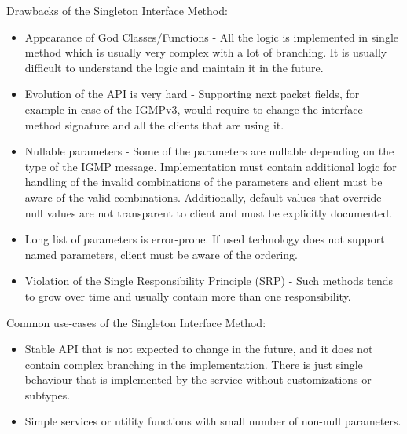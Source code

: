 Drawbacks of the Singleton Interface Method:

\begin{itemize}
    \item Appearance of God Classes/Functions - All the logic is implemented in single method which is usually
    very complex with a lot of branching.
    It is usually difficult to understand the logic and maintain it in the future.
    \item Evolution of the API is very hard - Supporting next packet fields, for example in case of the IGMPv3,
    would require to change the interface method signature and all the clients that are using it.
    \item Nullable parameters - Some of the parameters are nullable depending on the type of the IGMP message.
    Implementation must contain additional logic for handling of the invalid combinations of the parameters
    and client must be aware of the valid combinations.
    Additionally, default values that override null values are not transparent to client and must be explicitly
    documented.
    \item Long list of parameters is error-prone.
    If used technology does not support named parameters, client must be aware of the ordering.
    \item Violation of the Single Responsibility Principle (SRP) - Such methods tends to grow over time
    and usually contain more than one responsibility.
\end{itemize}

Common use-cases of the Singleton Interface Method:

\begin{itemize}
    \item Stable API that is not expected to change in the future,
    and it does not contain complex branching in the implementation.
    There is just single behaviour that is implemented by the service without customizations or subtypes.
    \item Simple services or utility functions with small number of non-null parameters.
\end{itemize}
